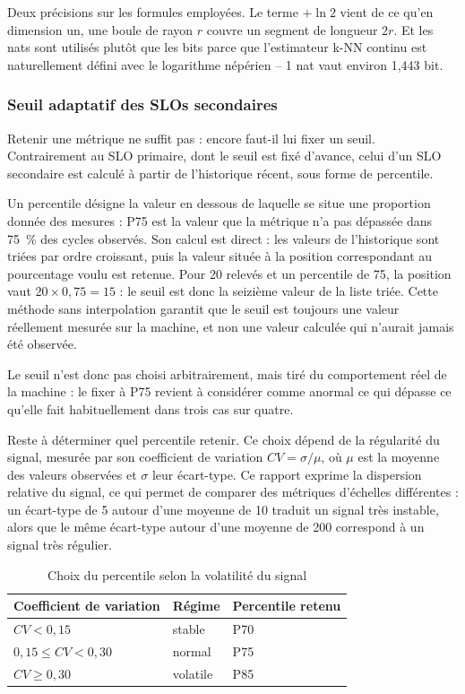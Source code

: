 Deux précisions sur les formules employées. Le terme $+\ln 2$ vient de ce qu'en dimension un, une boule de rayon $r$ couvre un segment de longueur $2r$. Et les nats sont utilisés plutôt que les bits parce que l'estimateur k-NN continu est naturellement défini avec le logarithme népérien -- 1 nat vaut environ 1,443 bit.
\subsubsection{Seuil adaptatif des SLOs secondaires}

Retenir une métrique ne suffit pas : encore faut-il lui fixer un seuil. Contrairement au SLO primaire, dont le seuil est fixé d'avance, celui d'un SLO secondaire est calculé à partir de l'historique récent, sous forme de percentile.

Un percentile désigne la valeur en dessous de laquelle se situe une proportion donnée des mesures : P75 est la valeur que la métrique n'a pas dépassée dans 75~\% des cycles observés. Son calcul est direct : les valeurs de l'historique sont triées par ordre croissant, puis la valeur située à la position correspondant au pourcentage voulu est retenue. Pour 20 relevés et un percentile de 75, la position vaut $20 \times 0{,}75 = 15$ : le seuil est donc la seizième valeur de la liste triée. Cette méthode sans interpolation garantit que le seuil est toujours une valeur réellement mesurée sur la machine, et non une valeur calculée qui n'aurait jamais été observée.

Le seuil n'est donc pas choisi arbitrairement, mais tiré du comportement réel de la machine : le fixer à P75 revient à considérer comme anormal ce qui dépasse ce qu'elle fait habituellement dans trois cas sur quatre.

Reste à déterminer quel percentile retenir. Ce choix dépend de la régularité du signal, mesurée par son coefficient de variation $CV = \sigma/\mu$, où $\mu$ est la moyenne des valeurs observées et $\sigma$ leur écart-type. Ce rapport exprime la dispersion relative du signal, ce qui permet de comparer des métriques d'échelles différentes : un écart-type de 5 autour d'une moyenne de 10 traduit un signal très instable, alors que le même écart-type autour d'une moyenne de 200 correspond à un signal très régulier.

\begin{table}[H]
    \centering
    \label{tab:percentile-adaptatif}
    \begin{tabular}{|l|l|l|}
        \hline
        \textbf{Coefficient de variation} & \textbf{Régime} & \textbf{Percentile retenu} \\
        \hline
        $CV < 0{,}15$ & stable & P70 \\
        \hline
        $0{,}15 \leq CV < 0{,}30$ & normal & P75 \\
        \hline
        $CV \geq 0{,}30$ & volatile & P85 \\
        \hline
    \end{tabular}
    \caption{Choix du percentile selon la volatilité du signal}

\end{table}
